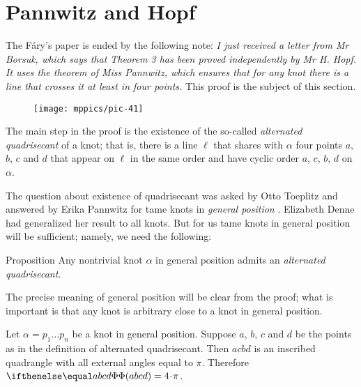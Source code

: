 \section{Pannwitz and Hopf}\label{sec:quadrisecant}

The F\'ary's paper \cite{fary} is ended by the following note:
\textit{I just received a letter from Mr Borsuk, which says that Theorem 3 has been proved independently by Mr H. Hopf.
It uses the theorem of Miss Pannwitz, which ensures that for any knot there is a line that crosses it at least in four
points.}
This proof is the subject of this section.

\begin{wrapfigure}{r}{22 mm}
\vskip-4mm
\centering
\texttt{[image: mppics/pic-41]}
\vskip0mm
\end{wrapfigure}

The main step in the proof is the existence of the so-called \emph{alternated quadrisecant} of a knot; that is, there is a line $\ell$ that shares with $\alpha$ four points $a$, $b$, $c$ and $d$
that appear on $\ell$ in the same order and have cyclic order $a$, $c$, $b$, $d$ on $\alpha$.

The question about existence of quadrisecant was asked by Otto Toep\-litz and answered by Erika Pannwitz for tame knots in \emph{general position} \cite{pannwitz}.
Elizabeth Denne had generalized her result \cite{denne, denne-survey} to all knots.
But for us tame knots in general position will be sufficient;
namely, we need the following:

\begin{thm}{Proposition}\label{prop:quadrisecant}
Any nontrivial knot $\alpha$ in general position admits an \emph{alternated quadrisecant}.
\end{thm}

The precise meaning of general position will be clear from the proof;
what is important is that any knot is arbitrary close to a knot in general position.

Let $\alpha=p_1\dots p_n$ be a knot in general position.
Suppose $a$, $b$, $c$ and $d$ be the points as in the definition of alternated quadrisecant.
Then $acbd$ is an inscribed quadrangle with all external angles equal to $\pi$.
Therefore $\tc{abcd}=4\cdot\pi$.

